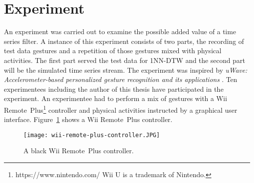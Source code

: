 \section{Experiment} \label{experiment}
An experiment was carried out to examine the possible added value of a time series filter. A instance of this experiment
consists of two parts, the recording of test data gestures and a repetition of those gestures mixed with physical
activities. The first part served the test data for 1NN-DTW and the second part will be the simulated time series
stream. The experiment was inspired by
\textit{uWave: Accelerometer-based personalized gesture recognition and its applications} \cite{liu2009uwave}. Ten
experimentees including the author of this thesis have participated in the experiment. An experimentee had to perform a
mix of gestures with a Wii
Remote\texttrademark~Plus\footnote{https://www.nintendo.com/ Wii U is a trademark of Nintendo.} controller and physical
activities instructed by a graphical user interface. Figure~\ref{fig:wii-remote} shows a Wii Remote\texttrademark~Plus
controller.
\begin{figure}
    \begin{center}
        \texttt{[image: wii-remote-plus-controller.JPG]}
    \end{center}
    \caption{A black Wii Remote\texttrademark~Plus controller.}
    \label{fig:wii-remote}
\end{figure}




